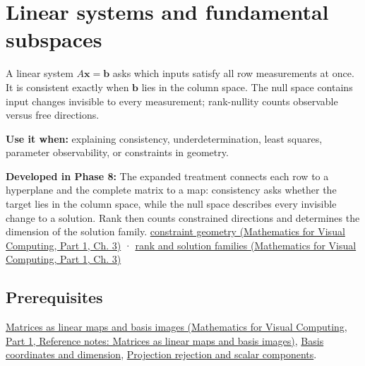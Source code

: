 \hypertarget{appendix-8572a4a060c1}{}\label{referencestart:appendix-8572a4a060c1}
\section{Linear systems and fundamental subspaces}\label{appendix-8572a4a060c1-linear-systems-and-fundamental-subspaces}

\hypertarget{appendix-8572a4a060c1-linear-systems-and-fundamental-subspaces}{}

A linear system \(A\mathbf x=\mathbf b\) asks which inputs satisfy all row measurements at once. It is consistent exactly when \(\mathbf b\) lies in the column space. The null space contains input changes invisible to every measurement; rank-nullity counts observable versus free directions.

\textbf{Use it when:} explaining consistency, underdetermination, least squares, parameter observability, or constraints in geometry.

\textbf{Developed in Phase 8:} The expanded treatment connects each row to a hyperplane and the complete matrix to a map: consistency asks whether the target lies in the column space, while the null space describes every invisible change to a solution. Rank then counts constrained directions and determines the dimension of the solution family. \href{../02-Mathematics-for-Visual-Computing-P01/main.pdf\#nameddest=01-foundations-i-ch019-a-system-is-an-intersection-of-constraints}{constraint geometry (Mathematics for Visual Computing, Part 1, Ch. 3)} · \href{../02-Mathematics-for-Visual-Computing-P01/main.pdf\#nameddest=01-foundations-i-ch019-rank-the-four-spaces-and-the-shape-of-the-answer}{rank and solution families (Mathematics for Visual Computing, Part 1, Ch. 3)}

\subsection{Prerequisites}\label{appendix-8572a4a060c1-prerequisites}

\hypertarget{appendix-8572a4a060c1-prerequisites}{}

\href{../02-Mathematics-for-Visual-Computing-P01/main.pdf\#nameddest=appendix-bd39c3bf5d64}{Matrices as linear maps and basis images (Mathematics for Visual Computing, Part 1, Reference notes: Matrices as linear maps and basis images)}, \hyperref[appendix-ce0341f7ea0d]{Basis coordinates and dimension}, \hyperref[appendix-505a502c372a]{Projection rejection and scalar components}.

